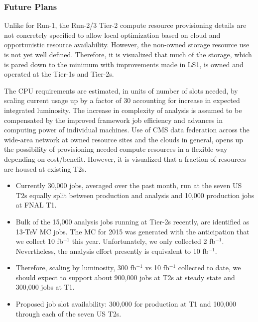 \documentclass[11pt,a4paper]{article}
\begin{document}
\subsubsection{Future Plans}


Unlike for Run-1, the Run-2/3 Tier-2 compute resource provisioning
details are not concretely specified to allow local optimization based
on cloud and opportunistic resource availability. However, the
non-owned storage resource use is not yet well defined. Therefore, it
is visualized that much of the storage, which is pared down to the
minimum with improvements made in LS1, is owned and operated at the
Tier-1s and Tier-2s.

The CPU requirements are estimated, in units of number of slots
needed, by scaling current usage up by a factor of 30 accounting for
increase in expected integrated luminosity.  The increase in
complexity of analysis is assumed to be compensated by the improved
framework job efficiency and advances in computing power of individual
machines.  Use of CMS data federation across the wide-area network at
owned resource sites and the clouds in general, opens up the
possibility of provisioning needed compute resources in a flexible way
depending on cost/benefit.  However, it is visualized that a fraction
of resources are housed at existing T2s.

\begin{itemize}
\item Currently 30,000 jobs, averaged over the past month, run at the seven 
US T2s equally split between production and analysis and 10,000 production
jobs at FNAL T1.
\item Bulk of the 15,000 analysis jobs running at Tier-2s recently, are 
identified as 13-TeV MC jobs.  The MC for 2015 was generated with the
anticipation that we collect 10 fb$^{-1}$ this year.  Unfortunately,
we only collected 2 fb$^{-1}$.  Nevertheless, the analysis effort 
presently is equivalent to 10 fb$^{-1}$.
\item Therefore, scaling by luminosity, 300 fb$^{-1}$ vs 10 fb$^{-1}$ collected 
to date, we should expect to support about 900,000 jobs at T2s at steady state 
and 300,000 jobs at T1.
\item Proposed job slot availability: 300,000 for production at T1 and 100,000 through each of the seven US T2s.
\end{itemize}

\end{document}
